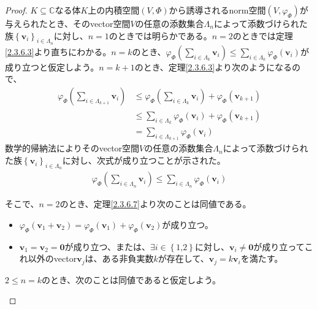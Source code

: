 \documentclass[dvipdfmx]{jsarticle}
\begin{document}
\begin{proof}
$K \subseteq \mathbb{C}$なる体$K$上の内積空間$(V,\varPhi)$から誘導されるnorm空間$\left( V,\varphi_{\varPhi} \right)$が与えられたとき、そのvector空間$V$の任意の添数集合$\varLambda_{n}$によって添数づけられた族$\left\{ \mathbf{v}_{i} \right\}_{i \in \varLambda_{n}}$に対し、$n = 1$のときでは明らかである。$n = 2$のときでは定理\ref{2.3.6.3}より直ちにわかる。$n = k$のとき、$\varphi_{\varPhi}\left( \sum_{i \in \varLambda_{k}} \mathbf{v}_{i} \right) \leq \sum_{i \in \varLambda_{k}} {\varphi_{\varPhi}\left( \mathbf{v}_{i} \right)}$が成り立つと仮定しよう。$n = k + 1$のとき、定理\ref{2.3.6.3}より次のようになるので、
\begin{align*}
\varphi_{\varPhi}\left( \sum_{i \in \varLambda_{k + 1}} \mathbf{v}_{i} \right) &\leq \varphi_{\varPhi}\left( \sum_{i \in \varLambda_{k}} \mathbf{v}_{i} \right) + \varphi_{\varPhi}\left( \mathbf{v}_{k + 1} \right)\\
&\leq \sum_{i \in \varLambda_{k}} {\varphi_{\varPhi}\left( \mathbf{v}_{i} \right)} + \varphi_{\varPhi}\left( \mathbf{v}_{k + 1} \right)\\
&= \sum_{i \in \varLambda_{k + 1}} {\varphi_{\varPhi}\left( \mathbf{v}_{i} \right)}
\end{align*}
数学的帰納法によりそのvector空間$V$の任意の添数集合$\varLambda_{n}$によって添数づけられた族$\left\{ \mathbf{v}_{i} \right\}_{i \in \varLambda_{n}}$に対し、次式が成り立つことが示された。
\begin{align*}
\varphi_{\varPhi}\left( \sum_{i \in \varLambda_{n}} \mathbf{v}_{i} \right) \leq \sum_{i \in \varLambda_{n}} {\varphi_{\varPhi}\left( \mathbf{v}_{i} \right)}
\end{align*}\par
そこで、$n = 2$のとき、定理\ref{2.3.6.7}より次のことは同値である。
\begin{itemize}
\item
  $\varphi_{\varPhi}\left( \mathbf{v}_{1} + \mathbf{v}_{2} \right) = \varphi_{\varPhi}\left( \mathbf{v}_{1} \right) + \varphi_{\varPhi}\left( \mathbf{v}_{2} \right)$が成り立つ。
\item
  $\mathbf{v}_{1} = \mathbf{v}_{2} = \mathbf{0}$が成り立つ、または、$\exists i \in \left\{ 1\text{,}2 \right\}$に対し、$\mathbf{v}_{i} \neq \mathbf{0}$が成り立ってこれ以外のvector$\mathbf{v}_{j}$は、ある非負実数$k$が存在して、$\mathbf{v}_{j} = k\mathbf{v}_{i}$を満たす。
\end{itemize}
$2 \leq n = k$のとき、次のことは同値であると仮定しよう。
\begin{itemize}

\end{itemize}
\end{proof}
\end{document}
